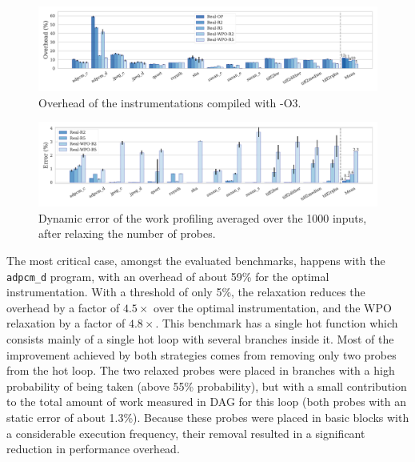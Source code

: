 \begin{figure}[t!]
    \centering
    \includegraphics[width=\textwidth]{figs/overhead-O3.pdf}
    \caption{Overhead of the instrumentations compiled with {\flagstype -O3}.}
    \label{fig:overhead-O3}
\end{figure}
\begin{figure}[t!]
    \centering
    \includegraphics[width=\textwidth]{figs/error-O3.pdf}
    \caption{Dynamic error of the work profiling averaged over the 1000 inputs, after relaxing the number of probes.}
    \label{fig:error-O3}
\end{figure}

The most critical case, amongst the evaluated benchmarks, happens with the
\texttt{adpcm\_d} program, with an overhead of about 59\% for the optimal
instrumentation.
With a threshold of only 5\%, the relaxation reduces
the overhead by a factor of $4.5\times$ over the optimal instrumentation,
and the WPO relaxation by a factor of $4.8\times$.
This benchmark has a single hot function
which consists mainly of a single hot loop with several branches inside it. %
Most of the improvement achieved by both strategies comes from removing only two
probes from the hot loop.
The two relaxed probes were placed in branches with a high probability of being
taken (above 55\% probability), but with a small contribution to the total amount
of work measured in DAG for this loop (both probes with an static error of
about 1.3\%).
Because these probes were placed in basic blocks with a considerable execution
frequency, their removal resulted in a significant reduction in performance
overhead.

